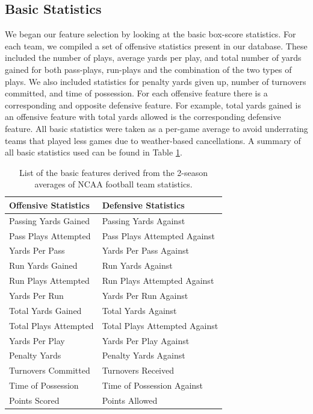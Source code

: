 \documentclass[10pt,twocolumn,letterpaper]{article}
\begin{document}
\subsection{Basic Statistics}
We began our feature selection by looking at the basic box-score statistics.  For each team, we compiled a set of offensive statistics present in our database.  These included the number of plays, average yards per play, and total number of yards gained for both pass-plays, run-plays and the combination of the two types of plays.  We also included statistics for penalty yards given up, number of turnovers committed, and time of possession.  For each offensive feature there is a corresponding and opposite defensive feature.  For example, total yards gained is an offensive feature with total yards allowed is the corresponding defensive feature.  All basic statistics were taken as a per-game average to avoid underrating teams that played less games due to weather-based cancellations.  A summary of all basic statistics used can be found in Table \ref{tab:basic_stats}.
\begin{table}
\begin{tabular}{l l}
\hline
Offensive Statistics & Defensive Statistics\\\hline
Passing Yards Gained & Passing Yards Against\\
Pass Plays Attempted & Pass Plays Attempted Against\\
Yards Per Pass & Yards Per Pass Against\\
Run Yards Gained & Run Yards Against\\
Run Plays Attempted & Run Plays Attempted Against\\
Yards Per Run & Yards Per Run Against\\
Total Yards Gained & Total Yards Against\\
Total Plays Attempted & Total Plays Attempted Against\\
Yards Per Play & Yards Per Play Against\\
Penalty Yards & Penalty Yards Against\\
Turnovers Committed & Turnovers Received\\
Time of Possession & Time of Possession Against\\
Points Scored & Points Allowed\\
\hline
\end{tabular}
\caption{\label{tab:basic_stats} List of the basic features derived from the 2-season averages of NCAA football team statistics.}
\end{table}
\end{document}
